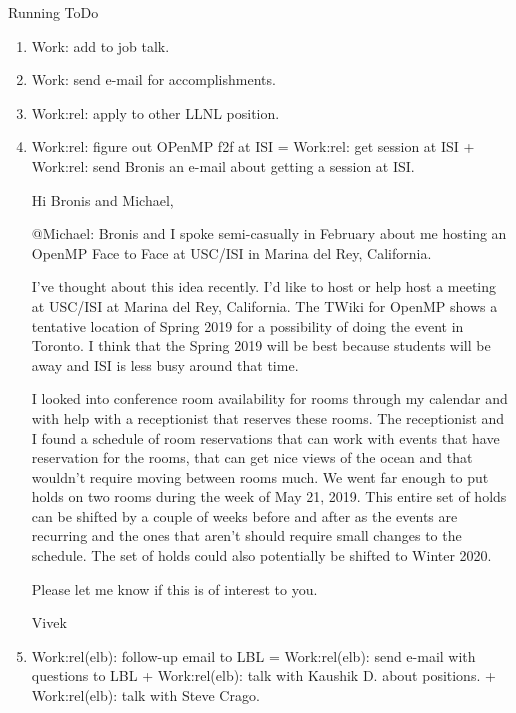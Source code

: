 \begin{columns}
\begin{column}{0.6\linewidth}
\begin{block}{Running ToDo}
\begin{enumerate}
      \item \tiny Work: add to job talk. 
      \item \tiny Work: send e-mail for accomplishments. 

      \item \tiny Work:rel: apply to other LLNL position.  \dl{} 

      \item \tiny Work:rel: figure out OPenMP f2f at ISI = Work:rel:
        get session at ISI +  Work:rel: send Bronis an e-mail about
        getting a session at ISI.

        Hi Bronis and Michael,
        
        @Michael: Bronis and I spoke semi-casually in February about me hosting an OpenMP Face to Face at USC/ISI in Marina del Rey, California. 
        
        I’ve thought about this idea recently. I’d like to host or
        help host a meeting at USC/ISI at Marina del Rey,
        California. The TWiki for OpenMP shows a tentative location of
        Spring 2019 for a possibility of doing the event in Toronto. I
        think that the Spring 2019 will be best because students will
        be away and ISI is less busy around that time. 
        
        I looked into conference room availability for rooms through
        my calendar and with help with a receptionist that reserves
        these rooms. The receptionist and I found a schedule of room
        reservations that can work with events that have reservation
        for the rooms, that can get nice views of the ocean and that
        wouldn’t require moving between rooms much. We went far enough
        to put holds on two rooms during the week of May 21,
        2019. This entire set of holds can be shifted by a couple of
        weeks before and after as the events are recurring and the
        ones that aren’t should require small changes to the
        schedule. The set of holds could also potentially be shifted
        to Winter 2020. 

        Please let me know if this is of interest to you. 
        
        Vivek


      \item \tiny Work:rel(elb): follow-up email to LBL =
        Work:rel(elb): send e-mail with questions to LBL +
        Work:rel(elb): talk with Kaushik D. about positions.  +
        Work:rel(elb): talk with Steve Crago. 
        

\end{enumerate}
\end{block}
\end{column}
\end{columns}
